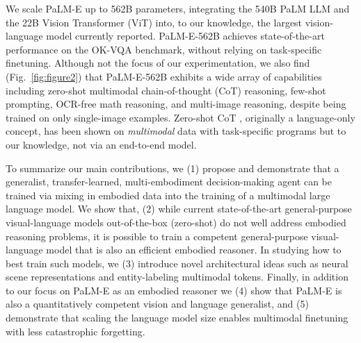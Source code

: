 We scale PaLM-E up to 562B parameters, integrating the 540B PaLM \cite{chowdhery2022palm} LLM and the 22B Vision Transformer (ViT) \cite{dehghani2023scaling} into, to our knowledge, the largest vision-language model currently reported.
PaLM-E-562B achieves state-of-the-art performance on the OK-VQA \cite{okvqa} benchmark, without relying on task-specific finetuning. Although not the focus of our experimentation, we also find (Fig.~\ref{fig:figure2}) that PaLM-E-562B exhibits a wide array of capabilities including zero-shot multimodal chain-of-thought (CoT) reasoning, few-shot prompting, OCR-free math reasoning, and multi-image reasoning, despite being trained on only single-image examples. Zero-shot CoT \cite{kojima2022large}, originally a language-only concept, has been shown on {\em{multimodal}} data with task-specific programs \cite{zeng2022socratic} but to our knowledge, not via an end-to-end model.

To summarize our main contributions, we (1) propose and demonstrate that a generalist, transfer-learned, multi-embodiment decision-making agent can be trained via mixing in embodied data into the training of a multimodal large language model. We show that, (2) while current state-of-the-art general-purpose visual-language models out-of-the-box (zero-shot) do not well address embodied reasoning problems, it is possible to train a competent general-purpose visual-language model that is also an efficient embodied reasoner.  In studying how to best train such models, we (3) introduce novel architectural ideas such as neural scene representations and entity-labeling multimodal tokens.  Finally, in addition to our focus on PaLM-E as an embodied reasoner we (4) show that PaLM-E is also a quantitatively competent vision and language generalist, and (5) demonstrate that scaling the language model size enables multimodal finetuning with less catastrophic forgetting.


